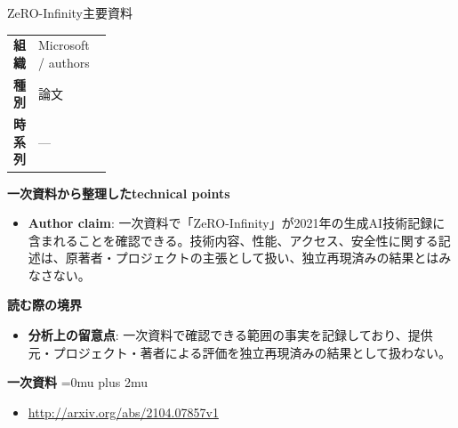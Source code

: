 \begin{technicalnote}{ZeRO-Infinity}{主要資料}
\begingroup
\begin{tabularx}{\linewidth}{@{}>{\bfseries}p{0.22\linewidth}X@{}}
組織 & Microsoft / authors \\
種別 & 論文 \\
時系列 & — \\
\end{tabularx}
\smallskip
{\bfseries 一次資料から整理したtechnical points}
\begin{itemize}[leftmargin=1.5em,itemsep=0.35em]
\item \textbf{Author claim}: 一次資料で「ZeRO-Infinity」が2021年の生成AI技術記録に含まれることを確認できる。技術内容、性能、アクセス、安全性に関する記述は、原著者・プロジェクトの主張として扱い、独立再現済みの結果とはみなさない。
\end{itemize}
\begin{minipage}{\linewidth}
{\bfseries 読む際の境界}
\begin{itemize}[leftmargin=1.5em,itemsep=0.35em]
\item \textbf{分析上の留意点}: 一次資料で確認できる範囲の事実を記録しており、提供元・プロジェクト・著者による評価を独立再現済みの結果として扱わない。
\end{itemize}
\begin{samepage}
{\bfseries 一次資料}
\begingroup\sloppy
\Urlmuskip=0mu plus 2mu\relax
\begin{itemize}[leftmargin=1.5em,itemsep=0.25em]
\item {\scriptsize\url{http://arxiv.org/abs/2104.07857v1}}
\end{itemize}
\endgroup
\end{samepage}
\end{minipage}
\endgroup
\end{technicalnote}
\medskip

